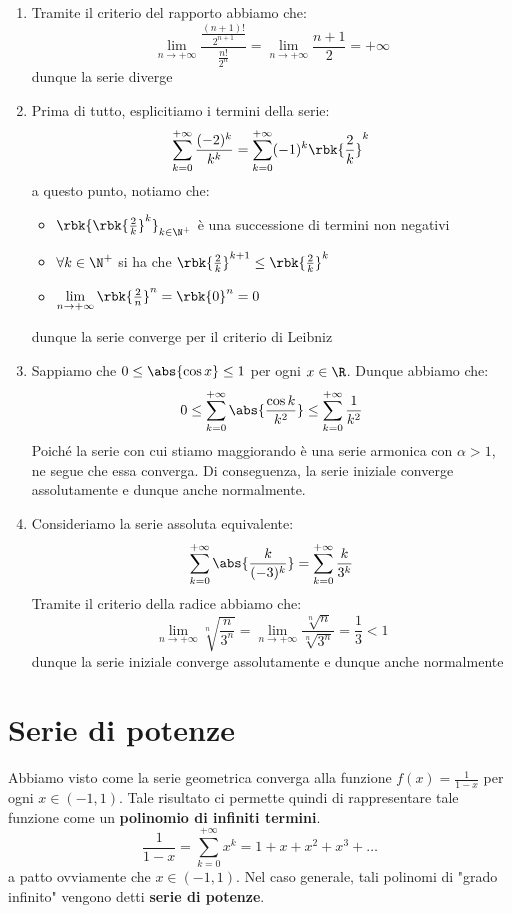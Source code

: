 \documentclass[a4paper, 12pt]{report}
\begin{document}
    \begin{enumerate}
        \item Tramite il criterio del rapporto abbiamo che:
        \[\lim_{n \to +\infty} \frac{\frac{(n+1)!}{2^{n+1}}}{\frac{n!}{2^n}} = \lim_{n \to +\infty} \frac{n+1}{2} = +\infty\]
        dunque la serie diverge
        \item Prima di tutto, esplicitiamo i termini della serie:
        \[\sum\limits_{k = 0}^{+\infty} \dfrac{(-2)^k}{k^k} = \sum\limits_{k = 0}^{+\infty} (-1)^k \rbk{\dfrac{2}{k}}^k\]
        a questo punto, notiamo che:
        \begin{itemize}
            \item $\rbk{\rbk{\frac{2}{k}}^k}_{k \in \N^+}$ è una successione di termini non negativi
            \item $\forall k \in \N^+$ si ha che $\rbk{\frac{2}{k}}^{k+1} \leq \rbk{\frac{2}{k}}^k$
            \item $\lim\limits_{n \to +\infty} \rbk{\frac{2}{n}}^n = \rbk{0}^n = 0$
        \end{itemize}
        dunque la serie converge per il criterio di Leibniz

        \item Sappiamo che $0 \leq \abs{\cos x} \leq 1$ per ogni $x \in \R$. Dunque abbiamo che:
        \[0 \leq \sum\limits_{k = 0}^{+\infty} \abs{\dfrac{\cos k}{k^2 }} \leq \sum\limits_{k = 0}^{+\infty} \dfrac{1}{k^2}\]
        Poiché la serie con cui stiamo maggiorando è una serie armonica con $\alpha > 1$, ne segue che essa converga. Di conseguenza, la serie iniziale converge assolutamente e dunque anche normalmente.

        \item Consideriamo la serie assoluta equivalente:
        \[\sum_{k = 0}^{+\infty} \abs{\frac{k}{(-3)^k}} = \sum_{k = 0}^{+\infty} \frac{k}{3^k}\]
        Tramite il criterio della radice abbiamo che:
        \[\lim_{n \to +\infty} \sqrt[n]{\frac{n}{3^n}} = \lim_{n \to +\infty} \frac{\sqrt[n]{n}}{\sqrt[n]{3^n}} = \frac{1}{3} < 1\]
        dunque la serie iniziale converge assolutamente e dunque anche normalmente
    \end{enumerate}

    \newpage

    \section{Serie di potenze}

    Abbiamo visto come la serie geometrica converga alla funzione $f(x) = \frac{1}{1-x}$ per ogni $x \in (-1, 1)$. Tale risultato ci permette quindi di rappresentare tale funzione come un \textbf{polinomio di infiniti termini}.
    \[\frac{1}{1-x} = \sum_{k = 0}^{+\infty} x^k = 1 + x + x^2 + x^3 + \ldots\]
    a patto ovviamente che $x \in (-1, 1)$. Nel caso generale, tali polinomi di "grado infinito" vengono detti \textbf{serie di potenze}.
\end{document}
